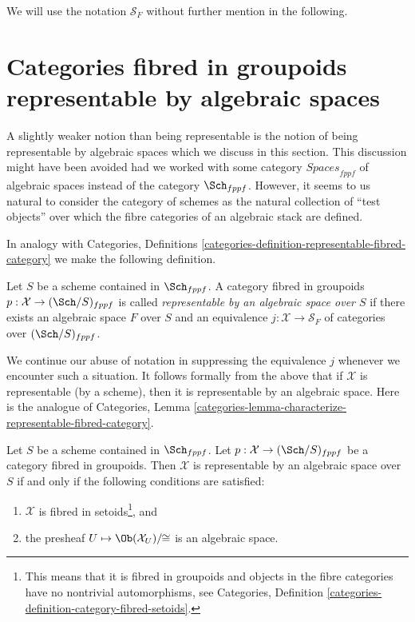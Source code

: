 \medskip\noindent
We will use the notation $\mathcal{S}_F$ without further mention in the
following.




\section{Categories fibred in groupoids representable by algebraic spaces}
\label{section-representable-by-algebraic-spaces}

\noindent
A slightly weaker notion than being representable is the notion of
being representable by algebraic spaces which we discuss in this section.
This discussion might have been avoided had we worked with some category
$\textit{Spaces}_{fppf}$ of algebraic spaces instead of the category
$\Sch_{fppf}$. However, it seems to us natural to consider the
category of schemes as the natural collection of ``test objects'' over
which the fibre categories of an algebraic stack are defined.

\medskip\noindent
In analogy with Categories, Definitions
\ref{categories-definition-representable-fibred-category}
we make the following definition.

\begin{definition}
\label{definition-representable-by-algebraic-space}
Let $S$ be a scheme contained in $\Sch_{fppf}$.
A category fibred in groupoids $p : \mathcal{X} \to (\Sch/S)_{fppf}$
is called {\it representable by an algebraic space over $S$}
if there exists an algebraic space $F$ over $S$ and an equivalence
$j : \mathcal{X} \to \mathcal{S}_F$
of categories over $(\Sch/S)_{fppf}$.
\end{definition}

\noindent
We continue our abuse of notation in suppressing the equivalence $j$
whenever we encounter such a situation.
It follows formally from the above that if $\mathcal{X}$ is
representable (by a scheme), then it is representable by an
algebraic space. Here is the analogue of
Categories,
Lemma \ref{categories-lemma-characterize-representable-fibred-category}.

\begin{lemma}
\label{lemma-characterize-representable-by-space}
Let $S$ be a scheme contained in $\Sch_{fppf}$.
Let $p : \mathcal{X} \to (\Sch/S)_{fppf}$
be a category fibred in groupoids.
Then $\mathcal{X}$ is representable by an algebraic space over $S$
if and only if the following conditions are satisfied:
\begin{enumerate}
\item $\mathcal{X}$ is fibred in setoids\footnote{This means that
it is fibred in groupoids and objects in the fibre categories
have no nontrivial automorphisms, see Categories,
Definition \ref{categories-definition-category-fibred-setoids}.}, and
\item the presheaf $U \mapsto \Ob(\mathcal{X}_U)/\!\!\cong$ is
an algebraic space.
\end{enumerate}
\end{lemma}

